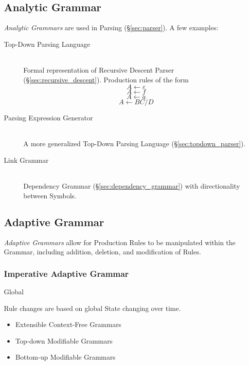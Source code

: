 \subsection{Analytic Grammar}\label{sec:analytic_grammar}

\emph{Analytic Grammars} are used in Parsing (\S\ref{sec:parser}). A
few examples:

\begin{description}
\item[Top-Down Parsing Language] \hfill \\
  Formal representation of Recursive Descent Parser
  (\S\ref{sec:recursive_descent}). Production rules of the form
  \[
    A \leftarrow \varepsilon
  \]\[
    A \leftarrow f
  \]\[
    A \leftarrow a
  \]\[
    A \leftarrow BC/D
  \]
\item[Parsing Expression Generator] \hfill \\
  A more generalized Top-Down Parsing Language
  (\S\ref{sec:topdown_parser}).
\item[Link Grammar] \hfill \\
  Dependency Grammar (\S\ref{sec:dependency_grammar}) with
  directionality between Symbols.
\end{description}



\subsection{Adaptive Grammar}\label{sec:adaptive_grammar}

\emph{Adaptive Grammars} allow for Production Rules to be manipulated
within the Grammar, including addition, deletion, and modification of
Rules.



\subsubsection{Imperative Adaptive Grammar}
\label{sec:imperative_adaptive}

Global

Rule changes are based on global State changing over time.

\begin{itemize}
  \item Extensible Context-Free Grammars
  \item Top-down Modifiable Grammars
  \item Bottom-up Modifiable Grammars
\end{itemize}



